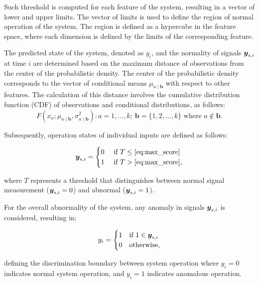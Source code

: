 Such threshold is computed for each feature of the system, resulting in a vector of lower and upper limits. The vector of limits is used to define the region of normal operation of the system. The region is defined as a hypercube in the feature space, where each dimension is defined by the limits of the corresponding feature.

The predicted state of the system, denoted as $y_i$, and the normality of signals $\boldsymbol{y} _{\text{s}, i}$ at time $i$ are determined based on the maximum distance of observations from the center of the probabilistic density. The center of the probabilistic density corresponds to the vector of conditional means $\mu_{a \mid \boldsymbol{b}}$ with respect to other features. The calculation of this distance involves the cumulative distribution function (CDF) of observations and conditional distributions, as  follows:
\begin{equation}
 {F(x_a; \mu_{a \mid \boldsymbol{b}}, \sigma_{a \mid \boldsymbol{b}}^2)}:a = 1,...,k;~ \boldsymbol{b} = \{1, 2, \ldots, k\} \text{ where }a \notin \boldsymbol{b} \text{.}\label{eq:max_score}
\end{equation}

Subsequently, operation states of individual inputs are defined as follows:

\begin{equation}
 \boldsymbol{y} _{\text{s}, i} =
 \begin{cases}
 0 & \text{ if } T \leq \eqref{eq:max_score}
 \\
 1 & \text{ if } T > \eqref{eq:max_score}
 \text{,}\label{eq:anomaly_signal}
 \end{cases}
\end{equation}

where $T$ represents a threshold that distinguishes between normal signal measurement ($\boldsymbol{y} _{\text{s}, i} = 0$) and abnormal ($\boldsymbol{y} _{\text{s}, i} = 1$).

For the overall abnormality of the system, any anomaly in signals $\boldsymbol{y} _{\text{s}, i}$ is considered, resulting in:

\begin{equation}
 y_i =
 \begin{cases}
 1 & \text{if } 1 \in \boldsymbol{y} _{\text{s}, i}
 \\
 0 & \text{otherwise}
 \text{,}\label{eq:anomaly}
 \end{cases}
\end{equation}


defining the discrimination boundary between system operation where $y_i = 0$ indicates normal system operation, and $y_i = 1$ indicates anomalous operation.

